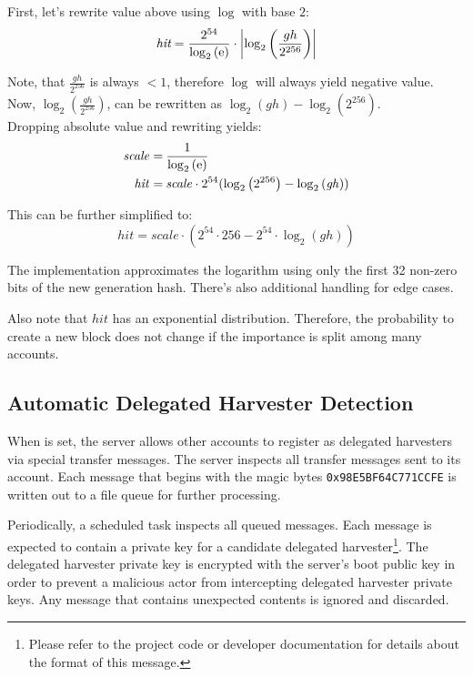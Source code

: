 First, let's rewrite value above using $\log$ with base $2$:
$$
\textit{hit} = \frac{2^{54}}{\log_2\left(\mathrm{e}\right)} \cdot \left|\log_2\left(\frac{gh}{2^{256}}\right)\right|
$$

Note, that $\frac{gh}{2^{256}}$ is always $< 1$, therefore $\log$ will always yield negative value. \\
Now, $\log_2\left(\frac{gh}{2^{256}}\right)$, can be rewritten as $\log_2\left(gh\right) - \log_2\left(2^{256}\right)$. \\

Dropping absolute value and rewriting yields:
\begin{align*}
	\mathit{scale} = \: & \frac{1}{\log_2\left(\mathrm{e}\right)} \\
	\mathit{hit} = \: & \mathit{scale} \cdot 2^{54} (\log_2\left(2^{256}\right) - \log_2\left(\mathit{gh}\right))
\end{align*}

This can be further simplified to:
$$
\mathit{hit} =  \mathit{scale} \cdot ( 2^{54} \cdot 256 -  2^{54} \cdot \log_2\left(\mathit{gh}\right))
$$

The implementation approximates the logarithm using only the first 32 non-zero bits of the new generation hash.
There's also additional handling for edge cases.

Also note that $\mathit{hit}$ has an exponential distribution. Therefore, the probability to create a new block does not change if the importance is split among many accounts.

\subsection{Automatic Delegated Harvester Detection}

When  is set, the server allows other accounts to register as delegated harvesters via special transfer messages.
The server inspects all transfer messages sent to its  account.
Each message that begins with the magic bytes \texttt{0x98E5BF64C771CCFE} is written out to a file queue for further processing.

Periodically, a scheduled task inspects all queued messages.
Each message is expected to contain a private key for a candidate delegated harvester\footnote{
Please refer to the project code or developer documentation for details about the format of this message.}.
The delegated harvester private key is encrypted with the server's boot public key in order to prevent a malicious actor from intercepting delegated harvester private keys.
Any message that contains unexpected contents is ignored and discarded.

